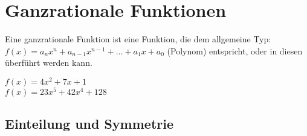 \section{Ganzrationale Funktionen}
Eine ganzrationale Funktion ist eine Funktion, die dem allgemeine Typ: $f(x)=a_nx^n+a_{n-1}x^{n-1}+ \dots + a_1x+a_0$
(Polynom) entspricht, oder in diesen überführt werden kann.

$f(x) = 4x^2+7x+1$\\
$f(x) = 23x^5+42x^4+128$

\subsection{Einteilung und Symmetrie}
